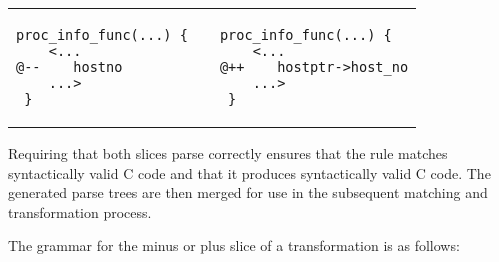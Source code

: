\documentclass{article}
\newcommand{\sizecodebis}[0]{\scriptsize}
\begin{document}
{%
\begin{center}
\begin{tabular}{p{5cm}p{3cm}p{5cm}}
\begin{lstlisting}[language=Cocci]
  proc_info_func(...) {
    <...
@--    hostno
    ...>
 }
\end{lstlisting}
&&
\begin{lstlisting}[language=Cocci]
  proc_info_func(...) {
    <...
@++    hostptr->host_no
    ...>
 }
\end{lstlisting}
\end{tabular}
\end{center}
}

\noindent
Requiring that both slices parse correctly ensures that the rule matches
syntactically valid C code and that it produces syntactically valid C code.
The generated parse trees are then merged for use in the subsequent
matching and transformation process.

The grammar for the minus or plus slice of a transformation is as follows:
\end{document}
